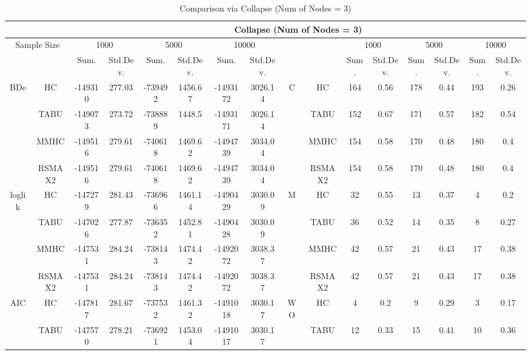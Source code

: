 \begin{table}[h]																										
\centering	\caption{Comparison via Collapse (Num of Nodes = 3)}	\tiny																						
{\tabcolsep=0.01in																										
\begin{tabular}{cc||cc|cc|cc||cc|cc|cc|cc}																										
\hline																										
&	&	\multicolumn{14}{c}{Collapse	(Num	of	Nodes	=	3)}\tabularnewline																			
\hline																										
\multicolumn{2}{c||}{Sample	Size}	&	\multicolumn{2}{c|}{1000}	&	\multicolumn{2}{c|}{5000}	&	\multicolumn{2}{c||}{10000}	&	&	&	\multicolumn{2}{c|}{1000}	&	\multicolumn{2}{c|}{5000}	&	\multicolumn{2}{c}{10000}\tabularnewline											
\hline																										
&	&	Sum.	&	Std.Dev.	&	Sum.	&	Std.Dev.	&	Sum.	&	Std.Dev.	&	&	&	Sum.	&	Std.Dev.	&	Sum.	&	Std.Dev.	&	Sum.	&	Std.Dev.\tabularnewline
\hline																										
\hline																										
\multirow{4}{*}{BDe} & HC &	-149310 & 	277.03 & 	-739492 & 	1456.67 & 	-1493172 & 	3026.14 & 	\multirow{4}{*}{C} & HC &	164 & 	0.56 & 	178 & 	0.44 & 	193 & 	0.26\tabularnewline													
& TABU &	-149073 & 	273.72 & 	-738889 & 	1448.5 & 	-1493171 & 	3026.14 & 	& TABU &	152 & 	0.67 & 	171 & 	0.57 & 	182 & 	0.54\tabularnewline													
& MMHC &	-149516 & 	279.61 & 	-740618 & 	1469.62 & 	-1494739 & 	3034.04 & 	& MMHC &	154 & 	0.58 & 	170 & 	0.48 & 	180 & 	0.4\tabularnewline													
& RSMAX2 &	-149516 & 	279.61 & 	-740618 & 	1469.62 & 	-1494739 & 	3034.04 & 	& RSMAX2 &	154 & 	0.58 & 	170 & 	0.48 & 	180 & 	0.4\tabularnewline													
\hline																										
\multirow{4}{*}{loglik} & HC &	-147279 & 	281.43 & 	-736966 & 	1461.14 & 	-1490429 & 	3030.09 & 	\multirow{4}{*}{M} & HC &	32 & 	0.55 & 	13 & 	0.37 & 	4 & 	0.2\tabularnewline													
& TABU &	-147026 & 	277.87 & 	-736352 & 	1452.81 & 	-1490428 & 	3030.09 & 	& TABU &	36 & 	0.52 & 	14 & 	0.35 & 	8 & 	0.27\tabularnewline													
& MMHC &	-147531 & 	284.24 & 	-738143 & 	1474.42 & 	-1492072 & 	3038.37 & 	& MMHC &	42 & 	0.57 & 	21 & 	0.43 & 	17 & 	0.38\tabularnewline													
& RSMAX2 &	-147531 & 	284.24 & 	-738143 & 	1474.42 & 	-1492072 & 	3038.37 & 	& RSMAX2 &	42 & 	0.57 & 	21 & 	0.43 & 	17 & 	0.38\tabularnewline													
\hline																										
\multirow{4}{*}{AIC} & HC &	-147817 & 	281.67 & 	-737532 & 	1461.32 & 	-1491018 & 	3030.17 & 	\multirow{4}{*}{WO} & HC &	4 & 	0.2 & 	9 & 	0.29 & 	3 & 	0.17\tabularnewline													
& TABU &	-147570 & 	278.21 & 	-736921 & 	1453.04 & 	-1491017 & 	3030.17 & 	& TABU &	12 & 	0.33 & 	15 & 	0.41 & 	10 & 	0.36\tabularnewline													

\end{tabular}}
\end{table}
